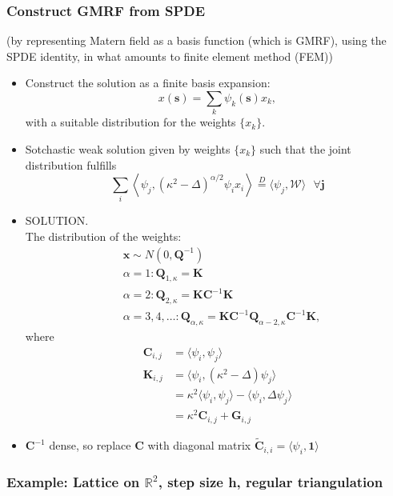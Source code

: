 \documentclass{article}
\begin{document}
\subsubsection*{Construct GMRF from SPDE}
(by representing Matern field as a basis function (which is GMRF), using the SPDE identity, in what amounts to finite element method (FEM))
      \begin{itemize}
      \item Construct the solution as a finite basis expansion:
      $$ x(\pmb{s}) = \sum_{k} \psi_{k}(\pmb{s})x_{k},$$ 
      with a suitable distribution for the weights $\{x_{k}\}$.
      \item Sotchastic weak solution given by weights $\{x_{k}\}$ such that the joint distribution fulfills
      $$ \sum_{i} \left< \psi_{j}, (\kappa^{2} - \Delta)^{\alpha/2} \psi_{i} x_{i} \right> \overset{D}{=} \langle \psi_{j}, \mathcal{W} \rangle \text{  } \forall \pmb{j}$$
      \item SOLUTION. \\The distribution of the weights:
      \begin{align}
      & \pmb{x} \sim N(0, \pmb{Q}^{-1}) \\
      & \alpha = 1: \pmb{Q}_{1,\kappa} = \pmb{K} \\
      & \alpha = 2: \pmb{Q}_{2,\kappa} = \pmb{K} \pmb{C}^{-1} \pmb{K}  \\
      & \alpha = 3, 4, \hdots : \pmb{Q}_{\alpha,\kappa} = \pmb{K} \pmb{C}^{-1} \pmb{Q}_{\alpha - 2,\kappa} \pmb{C}^{-1} \pmb{K},  
      \end{align}
      where
      \begin{align}
      \pmb{C}_{i,j} & = \langle \psi_{i}, \psi_{j} \rangle \\
      \pmb{K}_{i,j} & = \langle \psi_{i}, (\kappa^{2} - \Delta)\psi_{j} \rangle \\
      & = \kappa^{2} \langle \psi_{i}, \psi_{j} \rangle - \langle \psi_{i}, \Delta \psi_{j} \rangle \\
      & = \kappa^{2} \pmb{C}_{i,j} + \pmb{G}_{i,j}
      \end{align}
      \item $\pmb{C}^{-1}$ dense, so replace $\pmb{C}$ with diagonal matrix $\widetilde{\pmb{C}}_{i,i} = \langle \psi_{i}, \pmb{1} \rangle$
      \end{itemize}
\subsubsection*{Example: Lattice on $\mathbb{R}^{2}$, step size h, regular triangulation}
\end{document}
